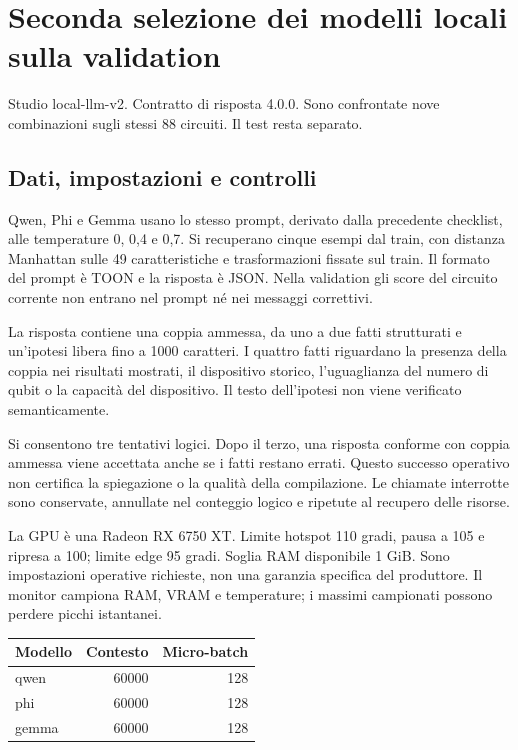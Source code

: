 \providecommand{\ValidationFiguresPath}{figures/}

\section{Seconda selezione dei modelli locali sulla validation}

Studio local-llm-v2. Contratto di risposta 4.0.0. Sono confrontate nove combinazioni sugli stessi 88 circuiti. Il test resta separato.

\subsection{Dati, impostazioni e controlli}

Qwen, Phi e Gemma usano lo stesso prompt, derivato dalla precedente checklist, alle temperature 0, 0,4 e 0,7. Si recuperano cinque esempi dal train, con distanza Manhattan sulle 49 caratteristiche e trasformazioni fissate sul train. Il formato del prompt è TOON e la risposta è JSON. Nella validation gli score del circuito corrente non entrano nel prompt né nei messaggi correttivi.

La risposta contiene una coppia ammessa, da uno a due fatti strutturati e un'ipotesi libera fino a 1000 caratteri. I quattro fatti riguardano la presenza della coppia nei risultati mostrati, il dispositivo storico, l'uguaglianza del numero di qubit o la capacità del dispositivo. Il testo dell'ipotesi non viene verificato semanticamente.

Si consentono tre tentativi logici. Dopo il terzo, una risposta conforme con coppia ammessa viene accettata anche se i fatti restano errati. Questo successo operativo non certifica la spiegazione o la qualità della compilazione. Le chiamate interrotte sono conservate, annullate nel conteggio logico e ripetute al recupero delle risorse.

La GPU è una Radeon RX 6750 XT. Limite hotspot 110 gradi, pausa a 105 e ripresa a 100; limite edge 95 gradi. Soglia RAM disponibile 1 GiB. Sono impostazioni operative richieste, non una garanzia specifica del produttore. Il monitor campiona RAM, VRAM e temperature; i massimi campionati possono perdere picchi istantanei.

\begin{center}\begin{tabular}{lrr}\toprule Modello & Contesto & Micro-batch\\\midrule

qwen & 60000 & 128\\

phi & 60000 & 128\\

gemma & 60000 & 128\\

\bottomrule\end{tabular}\end{center}

